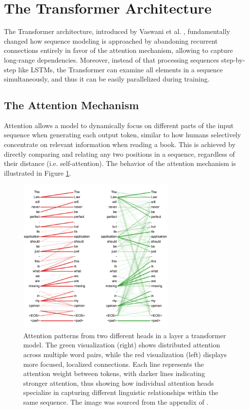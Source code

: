 \section{The Transformer Architecture}  \label{transformer_architecture}

The Transformer architecture, introduced by Vaswani et al. \cite{attention_is_all_you_need}, fundamentally changed how sequence modeling is approached by abandoning recurrent connections entirely in favor of the attention mechanism, allowing to capture long-range dependencies. Moreover, instead of that processing sequences step-by-step like LSTMs, the Transformer can examine all elements in a sequence simultaneously, and thus it can be easily parallelized during training.

\subsection{The Attention Mechanism}

Attention allows a model to dynamically focus on different parts of the input sequence when generating each output token, similar to how humans selectively concentrate on relevant information when reading a book. This is achieved by directly comparing and relating any two positions in a sequence, regardless of their distance (i.e. self-attention). The behavior of the attention mechanism is illustrated in Figure \ref{fig:attention}.

\begin{figure}[!htbp]
\centering
\includegraphics[width=0.7\textwidth]{images/attention.png}
\caption[Visualization of Attention Patterns]{Attention patterns from two different heads in a layer a transformer model. The green visualization (right) shows distributed attention across multiple word pairs, while the red visualization (left) displays more focused, localized connections. Each line represents the attention weight between tokens, with darker lines indicating stronger attention, thus showing how individual attention heads specialize in capturing different linguistic relationships within the same sequence. The image was sourced from the appendix of \cite{attention_is_all_you_need}.}
\label{fig:attention}
\end{figure}

